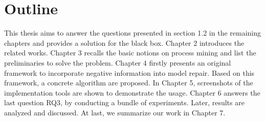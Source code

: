 \section{Outline}
This thesis aims to answer the questions presented in section 1.2 in the remaining chapters and provides a solution for the black box. 
Chapter 2 introduces the related works. Chapter 3 recalls the basic notions on process mining and list the preliminaries to solve the problem. 
Chapter 4 firstly presents an original framework to incorporate negative information into model repair. Based on this framework, a concrete algorithm are proposed. 
In Chapter 5, screenshots of the implementation tools are shown to demonstrate the usage.  Chapter 6 answers the last question RQ3, by conducting a bundle of experiments. Later, results are analyzed and discussed. 
At last, we summarize our work in Chapter 7. 



%